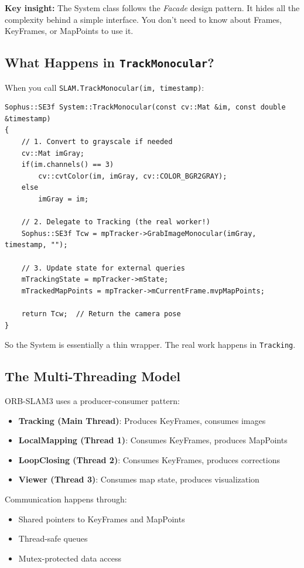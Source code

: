 \textbf{Key insight:} The System class follows the \textit{Facade} design pattern. It hides all the complexity behind a simple interface. You don't need to know about Frames, KeyFrames, or MapPoints to use it.

\subsection{What Happens in \texttt{TrackMonocular}?}

When you call \texttt{SLAM.TrackMonocular(im, timestamp)}:

\begin{lstlisting}[caption={TrackMonocular simplified flow}]
Sophus::SE3f System::TrackMonocular(const cv::Mat &im, const double &timestamp)
{
    // 1. Convert to grayscale if needed
    cv::Mat imGray;
    if(im.channels() == 3)
        cv::cvtColor(im, imGray, cv::COLOR_BGR2GRAY);
    else
        imGray = im;
    
    // 2. Delegate to Tracking (the real worker!)
    Sophus::SE3f Tcw = mpTracker->GrabImageMonocular(imGray, timestamp, "");
    
    // 3. Update state for external queries
    mTrackingState = mpTracker->mState;
    mTrackedMapPoints = mpTracker->mCurrentFrame.mvpMapPoints;
    
    return Tcw;  // Return the camera pose
}
\end{lstlisting}

So the System is essentially a thin wrapper. The real work happens in \texttt{Tracking}.

\subsection{The Multi-Threading Model}

ORB-SLAM3 uses a producer-consumer pattern:

\begin{itemize}
    \item \textbf{Tracking (Main Thread)}: Produces KeyFrames, consumes images
    \item \textbf{LocalMapping (Thread 1)}: Consumes KeyFrames, produces MapPoints
    \item \textbf{LoopClosing (Thread 2)}: Consumes KeyFrames, produces corrections
    \item \textbf{Viewer (Thread 3)}: Consumes map state, produces visualization
\end{itemize}

Communication happens through:
\begin{itemize}
    \item Shared pointers to KeyFrames and MapPoints
    \item Thread-safe queues
    \item Mutex-protected data access
\end{itemize}
